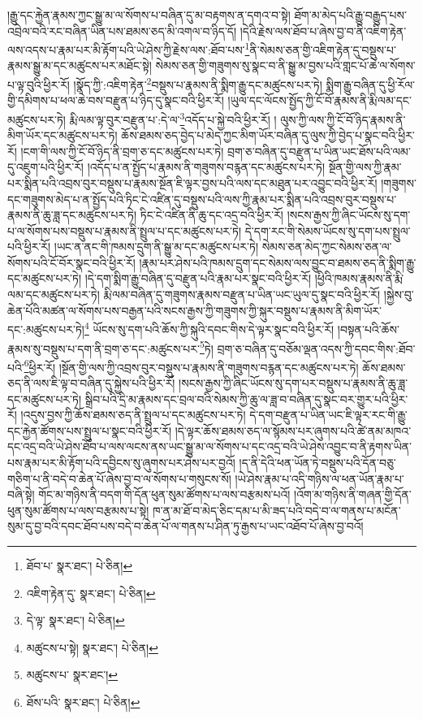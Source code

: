 །རྒྱུ་དང་རྐྱེན་རྣམས་ཀྱང་སྒྱུ་མ་ལ་སོགས་པ་བཞིན་དུ་མ་བརྟགས་ན་དགའ་བ་སྟེ། ཐོག་མ་མེད་པའི་རྒྱུ་བརྒྱུད་པས་འབྲེལ་བའི་རང་བཞིན་ཡིན་པས་ཐམས་ཅད་མི་འགལ་བ་ཉིད་དོ། །དེའི་རྗེས་ལས་ཐོབ་པ་ཞེས་བྱ་བ་ནི་འཇིག་རྟེན་ལས་འདས་པ་རྣམ་པར་མི་རྟོག་པའི་ཡེ་ཤེས་ཀྱི་རྗེས་ལས་:ཐོབ་པས་\footnote{ཐོབ་པ་  སྣར་ཐང་།  པེ་ཅིན། }ནི་སེམས་ཅན་གྱི་འཇིག་རྟེན་དུ་བསྡུས་པ་རྣམས་སྒྱུ་མ་དང་མཚུངས་པར་མཐོང་སྟེ། སེམས་ཅན་གྱི་གཟུགས་སུ་སྣང་བ་ནི་སྒྱུ་མ་བྱས་པའི་གླང་པོ་ཆེ་ལ་སོགས་པ་ལྟ་བུའི་ཕྱིར་རོ། །སྣོད་ཀྱི་:འཇིག་རྟེན་\footnote{འཇིག་རྟེན་དུ་  སྣར་ཐང་།  པེ་ཅིན། }བསྡུས་པ་རྣམས་ནི་སྨིག་རྒྱུ་དང་མཚུངས་པར་ཏེ། སྨིག་རྒྱུ་བཞིན་དུ་ཕྱི་རོལ་གྱི་དམིགས་པ་ཕལ་ཆེ་བས་བརྫུན་པ་ཉིད་དུ་སྣང་བའི་ཕྱིར་རོ། །ཡུལ་དང་ལོངས་སྤྱོད་ཀྱི་ངོ་བོ་རྣམས་ནི་རྨི་ལམ་དང་མཚུངས་པར་ཏེ། རྨི་ལམ་ལྟ་བུར་བརྫུན་པ་:དེ་ལ་\footnote{དེ་ལྟ་  སྣར་ཐང་།  པེ་ཅིན། }འདོད་པ་སྐྱེ་བའི་ཕྱིར་རོ། །
ལུས་ཀྱི་ལས་ཀྱི་ངོ་བོ་ཉིད་རྣམས་ནི་མིག་ཡོར་དང་མཚུངས་པར་ཏེ། ཆོས་ཐམས་ཅད་བྱེད་པ་མེད་ཀྱང་མིག་ཡོར་བཞིན་དུ་ལུས་ཀྱི་བྱེད་པ་སྣང་བའི་ཕྱིར་རོ། །ངག་གི་ལས་ཀྱི་ངོ་བོ་ཉིད་ནི་བྲག་ཅ་དང་མཚུངས་པར་ཏེ། བྲག་ཅ་བཞིན་དུ་བརྫུན་པ་ཡིན་ཡང་ཐོས་པའི་ལམ་དུ་འཇུག་པའི་ཕྱིར་རོ། །འདོད་པ་ན་སྤྱོད་པ་རྣམས་ནི་གཟུགས་བརྙན་དང་མཚུངས་པར་ཏེ། སྔོན་གྱི་ལས་ཀྱི་རྣམ་པར་སྨིན་པའི་འབྲས་བུར་བསྡུས་པ་རྣམས་སྔོན་ཇི་ལྟར་བྱས་པའི་ལས་དང་མཐུན་པར་འབྱུང་བའི་ཕྱིར་རོ། །གཟུགས་དང་གཟུགས་མེད་པ་ན་སྤྱོད་པའི་ཏིང་ངེ་འཛིན་དུ་བསྡུས་པའི་ལས་ཀྱི་རྣམ་པར་སྨིན་པའི་འབྲས་བུར་བསྡུས་པ་རྣམས་ནི་ཆུ་ཟླ་དང་མཚུངས་པར་ཏེ། ཏིང་ངེ་འཛིན་ནི་ཆུ་དང་འདྲ་བའི་ཕྱིར་རོ། །སངས་རྒྱས་ཀྱི་ཞིང་ཡོངས་སུ་དག་པ་ལ་སོགས་པས་བསྡུས་པ་རྣམས་ནི་སྤྲུལ་པ་དང་མཚུངས་པར་ཏེ། དེ་དག་རང་གི་སེམས་ཡོངས་སུ་དག་པས་སྤྲུལ་པའི་ཕྱིར་རོ། །ཡང་ན་ནང་གི་ཁམས་དྲུག་ནི་སྒྱུ་མ་དང་མཚུངས་པར་ཏེ། སེམས་ཅན་མེད་ཀྱང་སེམས་ཅན་ལ་སོགས་པའི་ངོ་བོར་སྣང་བའི་ཕྱིར་རོ། །རྣམ་པར་ཤེས་པའི་ཁམས་དྲུག་དང་སེམས་ལས་བྱུང་བ་ཐམས་ཅད་ནི་སྨིག་རྒྱུ་དང་མཚུངས་པར་ཏེ། །དེ་དག་སྨིག་རྒྱུ་བཞིན་དུ་བརྫུན་པའི་རྣམ་པར་སྣང་བའི་ཕྱིར་རོ། །ཕྱིའི་ཁམས་རྣམས་ནི་རྨི་ལམ་དང་མཚུངས་པར་ཏེ། རྨི་ལམ་བཞིན་དུ་གཟུགས་རྣམས་བརྫུན་པ་ཡིན་ཡང་ཡུལ་དུ་སྣང་བའི་ཕྱིར་རོ། །སྐྱེས་བུ་ཆེན་པོའི་མཚན་ལ་སོགས་པས་བརྒྱན་པའི་སངས་རྒྱས་ཀྱི་གཟུགས་ཀྱི་སྐུར་བསྡུས་པ་རྣམས་ནི་མིག་ཡོར་དང་:མཚུངས་པར་ཏེ།\footnote{མཚུངས་པ་སྟེ།  སྣར་ཐང་།  པེ་ཅིན། } ཡོངས་སུ་དག་པའི་ཆོས་ཀྱི་སྐུའི་དབང་གིས་དེ་ལྟར་སྣང་བའི་ཕྱིར་རོ། །བསྟན་པའི་ཆོས་རྣམས་སུ་བསྡུས་པ་དག་ནི་བྲག་ཅ་དང་:མཚུངས་པར་\footnote{མཚུངས་པ་  སྣར་ཐང་། }ཏེ། བྲག་ཅ་བཞིན་དུ་བཅོམ་ལྡན་འདས་ཀྱི་དབང་གིས་:ཐོབ་པའི་\footnote{ཐོས་པའི་  སྣར་ཐང་།  པེ་ཅིན། }ཕྱིར་རོ། །སྔོན་གྱི་ལས་ཀྱི་འབྲས་བུར་བསྡུས་པ་རྣམས་ནི་གཟུགས་བརྙན་དང་མཚུངས་པར་ཏེ། ཆོས་ཐམས་ཅད་ནི་ལས་ཇི་ལྟ་བ་བཞིན་དུ་སྐྱེས་པའི་ཕྱིར་རོ། །སངས་རྒྱས་ཀྱི་ཞིང་ཡོངས་སུ་དག་པར་བསྡུས་པ་རྣམས་ནི་ཆུ་ཟླ་དང་མཚུངས་པར་ཏེ། སྒྲིབ་པའི་དྲི་མ་རྣམས་དང་བྲལ་བའི་སེམས་ཀྱི་ཆུ་ལ་ཟླ་བ་བཞིན་དུ་སྣང་བར་གྱུར་པའི་ཕྱིར་རོ། །འདུས་བྱས་ཀྱི་ཆོས་ཐམས་ཅད་ནི་སྤྲུལ་པ་དང་མཚུངས་པར་ཏེ། དེ་དག་བརྫུན་པ་ཡིན་ཡང་ཇི་ལྟར་རང་གི་རྒྱུ་དང་རྐྱེན་ཚོགས་པས་སྤྲུལ་པ་སྣང་བའི་ཕྱིར་རོ། །དེ་ལྟར་ཆོས་ཐམས་ཅད་ལ་སྙོམས་པར་ཞུགས་པའི་ཚེ་ནམ་མཁའ་དང་འདྲ་བའི་ཡེ་ཤེས་ཐོབ་པ་ལས་ལངས་ནས་ཡང་སྒྱུ་མ་ལ་སོགས་པ་དང་འདྲ་བའི་ཡེ་ཤེས་འབྱུང་བ་ནི་རྟགས་ཡིན་པས་རྣམ་པར་མི་རྟོག་པའི་དབྱིངས་སུ་ཞུགས་པར་ཤེས་པར་བྱའོ། །ད་ནི་དེའི་ཕན་ཡོན་ཏེ་བསྡུས་པའི་དོན་བཅུ་གཅིག་པ་ནི་བདེ་བ་ཆེན་པོ་ཞེས་བྱ་བ་ལ་སོགས་པ་གསུངས་སོ། །ཡེ་ཤེས་རྣམ་པ་འདི་གཉིས་ལ་ཕན་ཡོན་རྣམ་པ་བཞི་སྟེ། གོང་མ་གཉིས་ནི་བདག་གི་དོན་ཕུན་སུམ་ཚོགས་པ་ལས་བརྩམས་པའོ། །འོག་མ་གཉིས་ནི་གཞན་གྱི་དོན་ཕུན་སུམ་ཚོགས་པ་ལས་བརྩམས་པ་སྟེ། ཁ་ན་མ་ཐོ་བ་མེད་ཅིང་དམ་པ་མི་ཟད་པའི་བདེ་བ་ལ་གནས་པ་མངོན་སུམ་དུ་བྱ་བའི་དབང་ཐོབ་པས་བདེ་བ་ཆེན་པོ་ལ་གནས་པ་ཤིན་ཏུ་རྒྱས་པ་ཡང་འཐོབ་པོ་ཞེས་བྱ་བའོ། 